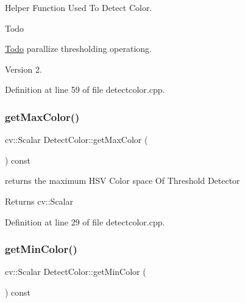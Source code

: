 Helper Function Used To Detect Color. 

\begin{DoxyRefDesc}{Todo}
\item[\hyperlink{todo__todo000002}{Todo}]parallize thresholding operationg. \end{DoxyRefDesc}
\begin{DoxyVersion}{Version}
2. 
\end{DoxyVersion}


Definition at line 59 of file detectcolor.\+cpp.

\mbox{\label{class_image_processor_1_1_detect_color_a80a162584cbb4f2ccb452f35bfee19f5}} 
\subsubsection{\texorpdfstring{get\+Max\+Color()}{getMaxColor()}}
{\footnotesize\ttfamily cv\+::\+Scalar Detect\+Color\+::get\+Max\+Color (\begin{DoxyParamCaption}{ }\end{DoxyParamCaption}) const}



returns the maximum H\+SV Color space Of Threshold Detector 

\begin{DoxyReturn}{Returns}
cv\+::\+Scalar 
\end{DoxyReturn}


Definition at line 29 of file detectcolor.\+cpp.

\mbox{\label{class_image_processor_1_1_detect_color_a968a764ffc529d9a7022942c047559eb}} 
\subsubsection{\texorpdfstring{get\+Min\+Color()}{getMinColor()}}
{\footnotesize\ttfamily cv\+::\+Scalar Detect\+Color\+::get\+Min\+Color (\begin{DoxyParamCaption}{ }\end{DoxyParamCaption}) const}



